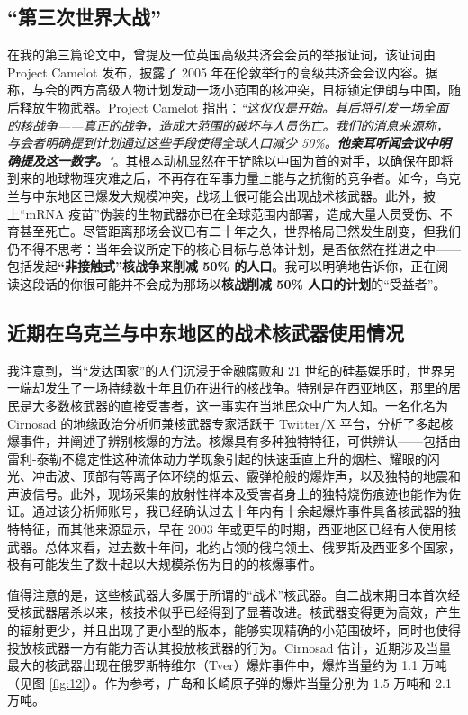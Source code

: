 \documentclass[10pt,twocolumn,letterpaper]{article}
\begin{document}
\subsection{“第三次世界大战”}
在我的第三篇论文中，曾提及一位英国高级共济会会员的举报证词，该证词由 Project Camelot 发布，披露了 2005 年在伦敦举行的高级共济会会议内容。据称，与会的西方高级人物计划发动一场小范围的核冲突，目标锁定伊朗与中国，随后释放生物武器。Project Camelot 指出：\textit{“这仅仅是开始。其后将引发一场全面的核战争——真正的战争，造成大范围的破坏与人员伤亡。我们的消息来源称，与会者明确提到计划通过这些手段使得全球人口减少 50\%。\textbf{他亲耳听闻会议中明确提及这一数字。}"}\cite{23}。其根本动机显然在于铲除以中国为首的对手，以确保在即将到来的地球物理灾难之后，不再存在军事力量上能与之抗衡的竞争者。如今，乌克兰与中东地区已爆发大规模冲突，战场上很可能会出现战术核武器。此外，披上“mRNA 疫苗”伪装的生物武器亦已在全球范围内部署，造成大量人员受伤、不育甚至死亡。尽管距离那场会议已有二十年之久，世界格局已然发生剧变，但我们仍不得不思考：当年会议所定下的核心目标与总体计划，是否依然在推进之中——包括发起\textbf{“非接触式”核战争来削减 50\% 的人口}。我可以明确地告诉你，正在阅读这段话的你很可能并不会成为那场以\textbf{核战削减 50\% 人口的计划}的“受益者”。

\subsection{近期在乌克兰与中东地区的战术核武器使用情况}
我注意到，当“发达国家”的人们沉浸于金融腐败和 21 世纪的硅基娱乐时，世界另一端却发生了一场持续数十年且仍在进行的核战争。特别是在西亚地区，那里的居民是大多数核武器的直接受害者，这一事实在当地民众中广为人知。一名化名为 Cirnosad 的地缘政治分析师兼核武器专家活跃于 Twitter/X 平台，分析了多起核爆事件，并阐述了辨别核爆的方法\cite{24}。核爆具有多种独特特征，可供辨认——包括由雷利-泰勒不稳定性这种流体动力学现象引起的快速垂直上升的烟柱、耀眼的闪光、冲击波、顶部有等离子体环绕的烟云、霰弹枪般的爆炸声，以及独特的地震和声波信号。此外，现场采集的放射性样本及受害者身上的独特烧伤痕迹也能作为佐证。通过该分析师账号，我已经确认过去十年内有十余起爆炸事件具备核武器的独特特征，而其他来源显示，早在 2003 年或更早的时期，西亚地区已经有人使用核武器。总体来看，过去数十年间，北约占领的俄乌领土、俄罗斯及西亚多个国家，极有可能发生了数十起以大规模杀伤为目的的核爆事件。

值得注意的是，这些核武器大多属于所谓的“战术”核武器。自二战末期日本首次经受核武器屠杀以来，核技术似乎已经得到了显著改进。核武器变得更为高效，产生的辐射更少，并且出现了更小型的版本，能够实现精确的小范围破坏，同时也使得投放核武器一方有能力否认其投放核武器的行为\cite{29}。Cirnosad 估计，近期涉及当量最大的核武器出现在俄罗斯特维尔（Tver）爆炸事件中，爆炸当量约为 1.1 万吨\cite{24}（见图 \ref{fig:12}）。作为参考，广岛和长崎原子弹的爆炸当量分别为 1.5 万吨和 2.1 万吨\cite{30}。
\end{document}
